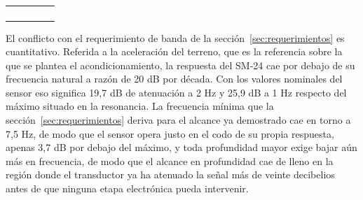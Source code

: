 \begin{table}[!tb]
\centering
\footnotesize
\caption{}
\label{tab:transductores}
\begin{tabularx}{0.94\textwidth}{@{}YYYYY@{}}
\toprule
{} &  &  &  &  \\
\midrule
{} &  &  &  &  \\
 &  &  &  &  \\
 &  &  &  &  \\
 &  &  &  &  \\
\bottomrule
\end{tabularx}
\end{table}

El conflicto con el requerimiento de banda de la sección~\ref{sec:requerimientos} es cuantitativo. Referida a la aceleración del terreno, que es la referencia sobre la que se plantea el acondicionamiento, la respuesta del SM-24 cae por debajo de su frecuencia natural a razón de 20 dB por década. Con los valores nominales del sensor eso significa 19,7 dB de atenuación a 2 Hz y 25,9 dB a 1 Hz respecto del máximo situado en la resonancia. La frecuencia mínima que la sección~\ref{sec:requerimientos} deriva para el alcance ya demostrado cae en torno a 7,5 Hz, de modo que el sensor opera justo en el codo de su propia respuesta, apenas 3,7 dB por debajo del máximo, y toda profundidad mayor exige bajar aún más en frecuencia, de modo que el alcance en profundidad cae de lleno en la región donde el transductor ya ha atenuado la señal más de veinte decibelios antes de que ninguna etapa electrónica pueda intervenir.

